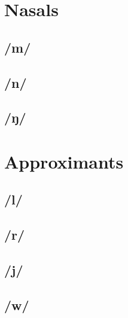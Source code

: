 \section{Nasals}
\subsection{/m/}
\subsection{/n/}
\subsection{/ŋ/}

\section{Approximants}
\subsection{/l/}
\subsection{/r/}
\subsection{/j/}
\subsection{/w/}